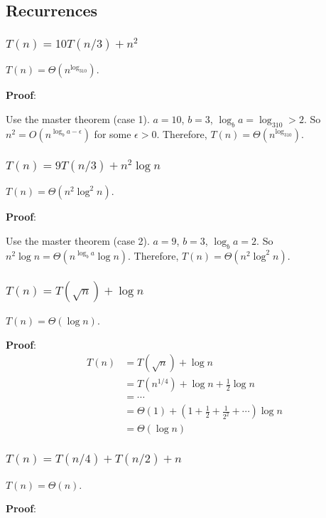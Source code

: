 \documentclass{article}
\begin{document}
\subsection{Recurrences}
\subsubsection{$T(n)=10T(n/3)+n^2$}
$T(n)=\Theta(n^{\log_310})$.

\noindent\textbf{Proof}:

Use the master theorem (case 1). $a=10$, $b=3$, $\log_ba=\log_310>2$. So $n^2=O(n^{\log_ba-\epsilon})$ for some $\epsilon>0$. Therefore, $T(n)=\Theta(n^{\log_310})$.

\subsubsection{$T(n)=9T(n/3)+n^2\log n$}
$T(n)=\Theta(n^2\log^2n)$.

\noindent\textbf{Proof}:

Use the master theorem (case 2). $a=9$, $b=3$, $\log_ba=2$. So $n^2\log n=\Theta(n^{\log_ba}\log n)$. Therefore, $T(n)=\Theta(n^2\log^2n)$.

\subsubsection{$T(n)=T(\sqrt{n})+\log n$}
$T(n)=\Theta(\log n)$.

\noindent\textbf{Proof}:
\begin{align*}
T(n)&=T(\sqrt{n})+\log n\\
&=T(n^{1/4})+\log n+\frac{1}{2}\log n\\
&=\cdots\\
&=\Theta(1)+\left(1+\frac{1}{2}+\frac{1}{2^2}+\cdots\right)\log n\\
&=\Theta(\log n)
\end{align*}

\subsubsection{$T(n)=T(n/4)+T(n/2)+n$}
$T(n)=\Theta(n)$.

\noindent\textbf{Proof}:
\end{document}
